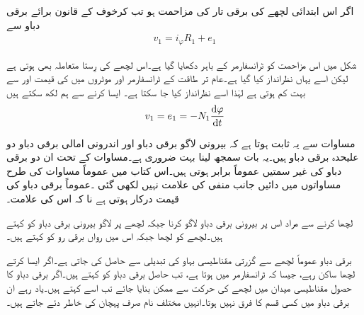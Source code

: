 اگر اس ابتدائی لچھے کی برقی تار کی مزاحمت  ہو تب کرخوف کے قانون برائے برقی دباو سے
\begin{align}\label{مساوات_ٹرانسفارمر_بیرونی_اندرونی_دباو_فرق}
v_1 = i_{\varphi} R_1+e_1
\end{align}

شکل میں اس مزاحمت کو ٹرانسفارمر کے باہر دکھایا گیا ہے۔اس لچھے کی رِستا متعاملہ بھی ہوتی ہے لیکن اسے یہاں نظرانداز کیا گیا ہے۔عام تر طاقت کے ٹرانسفارمر اور موٹروں  میں  کی قیمت  اور  سے بہت کم ہوتی ہے لہٰذا اسے نظرانداز کیا جا سکتا ہے۔ ایسا کرنے سے ہم لکھ سکتے ہیں 
\begin{align}\label{مساوات_ٹرانسفارمر_بیرونی_اندرونی_دباو_تقریبا_برابر}
v_1 = e_1=-N_1 \frac{\dif \varphi}{\dif t}
\end{align}

مساوات  سے یہ ثابت ہوتا ہے کہ بیرونی لاگو برقی دباو  اور اندرونی امالی برقی دباو  دو علیحدہ برقی دباو ہیں۔یہ بات سمجھ لینا بہت ضروری ہے۔مساوات  کے تحت ان دو برقی دباو کی غیر سمتیں عموماً برابر ہوتی ہیں۔اس کتاب میں عموماً مساوات   کی طرح مساواتوں میں دائیں جانب منفی کی علامت نہیں لکھی گئی ۔عموماً برقی دباو کی قیمت درکار ہوتی ہے نا کہ اس کی علامت۔

لچھا  کرنے سے مراد اس پر بیرونی برقی دباو لاگو کرنا  جبکہ لچھے پر لاگو بیرونی برقی دباو کو   کہتے ہیں۔لچھے  کو  لچھا جبکہ اس میں رواں برقی رو کو  کہتے ہیں۔

برقی دباو عموماً لچھے سے گزرتی مقناطیسی بہاو کی تبدیلی سے حاصل کی جاتی ہے۔اگر ایسا کرتے لچھا ساکن رہے، جیسا کہ ٹرانسفارمر میں ہوتا ہے، تب حاصل برقی دباو کو   کہتے ہیں۔اگر برقی دباو کا حصول مقناطیسی میدان میں لچھے کی حرکت سے ممکن بنایا جائے تب اسے    کہتے ہیں۔یاد رہے ان برقی دباو میں کسی قسم کا فرق نہیں ہوتا۔انہیں مختلف نام صرف پہچان کی خاطر دئے جاتے ہیں۔

